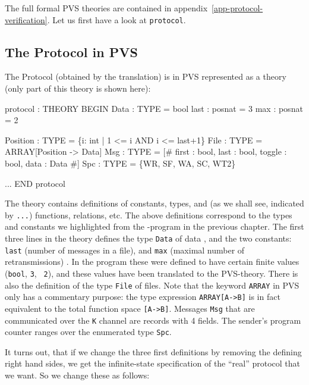 The       full   formal     PVS    theories     are     contained   in
appendix~\ref{app-protocol-verification}.  Let us first have a look at
{\tt protocol}.


\subsection{The Protocol in PVS}

The Protocol (obtained by the translation) is in PVS represented  as a
theory (only part of this theory is shown here):

\begin{smallsession}
  protocol : THEORY
  BEGIN
    Data : TYPE = bool
    last : posnat = 3
    max  : posnat = 2
      
    Position : TYPE = \{i: int | 1 <= i AND i <= last+1\}
    File     : TYPE = ARRAY[Position -> Data]
    Msg      : TYPE = [# first  : bool, 
                         last   : bool, 
                         toggle : bool, 
                         data   : Data #]
    Spc      : TYPE = \{WR, SF, WA, SC, WT2\}

    ...
  END protocol
\end{smallsession}

The theory contains definitions of  constants, types, and (as we shall
see,  indicated by {\tt ...})  functions,  relations, etc.  The  above
definitions correspond to the  types and constants we highlighted from
the \Murphi{}-program in the previous chapter.   The first three lines
in the  theory  defines the type {\tt   Data} of data  ,   and the two
constants: {\tt last} (number of messages in  a file), and {\tt max}
(maximal number of retransmissions) .   In the \Murphi{} program these
were defined to have certain finite  values ({\tt bool}, {\tt 3}, {\tt
2}), and these values have been translated to the PVS-theory. There is
also the definition of the type {\tt File} of files. Note that
the keyword {\tt ARRAY} in PVS only has a commentary purpose: the type
expression {\tt  ARRAY[A->B]}  is  in fact  equivalent   to the  total
function space {\tt [A->B]}.  Messages {\tt Msg} that are communicated
over the   {\tt K} channel are  records  with 4  fields.  The sender's
program counter ranges over the enumerated type {\tt Spc}.

It turns  out, that if  we  change  the three  first definitions  by
removing  the  defining  right hand  sides, we  get  the  infinite-state
specification of the ``real'' protocol that we  want. So we change these
as follows:

